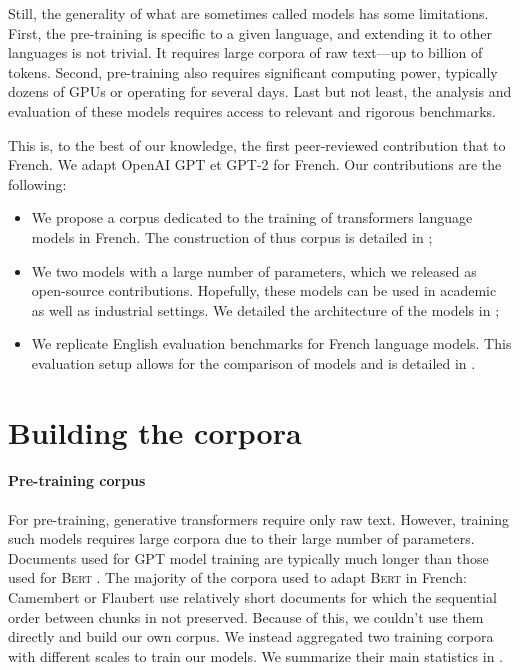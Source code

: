 Still, the generality of what are sometimes called  models has some limitations. First, the pre-training is specific to a given language, and extending it to other languages is not trivial. It requires large corpora of raw text—up to billion of tokens. Second, pre-training also requires significant computing power, typically dozens of GPUs or  operating for several days. Last but not least, the analysis and evaluation of these models requires access to relevant and rigorous benchmarks.



This is, to the best of our knowledge, the first peer-reviewed contribution that  to French. We adapt OpenAI GPT et GPT-2 \parencite{radford_2018, radford_2019} for French. Our contributions are the following:
\begin{itemize}
    \item We propose a corpus dedicated to the training of transformers language models in French. The construction of thus corpus is detailed in  ;
    \item We  two models with a large number of parameters, which we released as open-source contributions. Hopefully, these models can be used in academic as well as industrial settings. We detailed the architecture of the models in  ;
    \item We replicate English evaluation benchmarks for French language models. This evaluation setup allows for the comparison of models and is detailed in .
\end{itemize}

\section{Building the corpora}

\paragraph{Pre-training corpus} For pre-training, generative transformers require only raw text. However, training such models requires large corpora due to their large number of parameters. Documents used for GPT model training are typically much longer than those used for \textsc{Bert} \parencite{devlin_19}. The majority of the corpora used to adapt \textsc{Bert} in French: Camembert \parencite{martin_20} or Flaubert \parencite{le_20b, le_20a} use relatively short documents for which the sequential order  between chunks in not preserved. Because of this, we couldn't use them directly and build our own corpus.  We instead aggregated two training corpora with different scales to train our models. We summarize their main statistics in .

